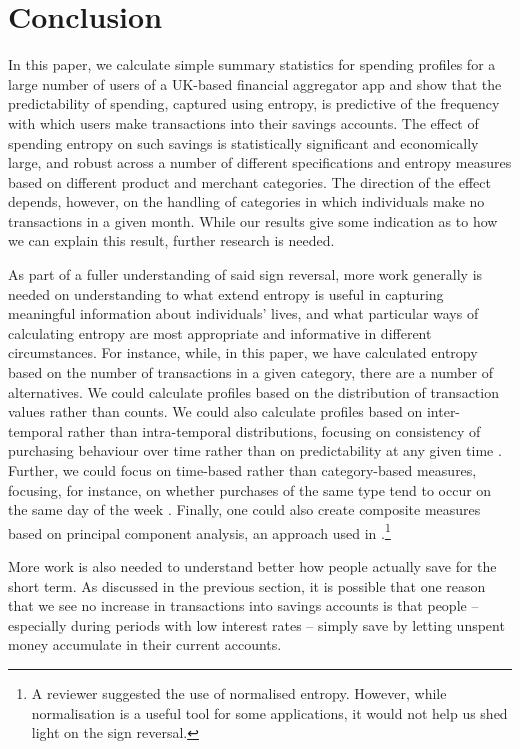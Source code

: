 
\section{Conclusion}
\label{sec:conclusion}

In this paper, we calculate simple summary statistics for spending profiles for
a large number of users of a UK-based financial aggregator app and show that
the predictability of spending, captured using entropy, is predictive of the
frequency with which users make transactions into their savings accounts. The
effect of spending entropy on such savings is statistically significant and
economically large, and robust across a number of different specifications and
entropy measures based on different product and merchant categories. The
direction of the effect depends, however, on the handling of categories in
which individuals make no transactions in a given month. While our results give
some indication as to how we can explain this result, further research is
needed.

As part of a fuller understanding of said sign reversal, more work generally is
needed on understanding to what extend entropy is useful in capturing
meaningful information about individuals' lives, and what particular ways of
calculating entropy are most appropriate and informative in different
circumstances. For instance, while, in this paper, we have calculated entropy
based on the number of transactions in a given category, there are a number of
alternatives. We could calculate profiles based on the distribution of
transaction values rather than counts. We could also calculate profiles based
on inter-temporal rather than intra-temporal distributions, focusing on
consistency of purchasing behaviour over time rather than on predictability at
any given time \citep{krumme2013predictability}. Further, we could focus on
time-based rather than category-based measures, focusing, for instance, on
whether purchases of the same type tend to occur on the same day of the week
\citep{guidotti2015behavioral}. Finally, one could also create composite
measures based on principal component analysis, an approach used in
\citet{eagle2010network}.\footnote{A reviewer suggested the use of normalised entropy. However, while normalisation is a useful tool for some applications, it would not help us shed light on the sign reversal.}

More work is also needed to understand better how people actually save for the short term. As discussed in the previous section, it is possible that one reason that we see no increase in transactions into savings accounts is that people -- especially during periods with low interest rates -- simply save by letting unspent money accumulate in their current accounts.

